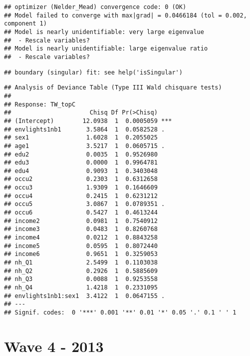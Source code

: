 \documentclass[
]{book}
\begin{document}
\begin{verbatim}
## optimizer (Nelder_Mead) convergence code: 0 (OK)
## Model failed to converge with max|grad| = 0.0466184 (tol = 0.002, component 1)
## Model is nearly unidentifiable: very large eigenvalue
##  - Rescale variables?
## Model is nearly unidentifiable: large eigenvalue ratio
##  - Rescale variables?
\end{verbatim}

\begin{verbatim}
## boundary (singular) fit: see help('isSingular')
\end{verbatim}

\begin{verbatim}
## Analysis of Deviance Table (Type III Wald chisquare tests)
## 
## Response: TW_topC
##                      Chisq Df Pr(>Chisq)    
## (Intercept)        12.0938  1  0.0005059 ***
## envlights1nb1       3.5864  1  0.0582528 .  
## sex1                1.6028  1  0.2055025    
## age1                3.5217  1  0.0605715 .  
## edu2                0.0035  1  0.9526980    
## edu3                0.0000  1  0.9964781    
## edu4                0.9093  1  0.3403048    
## occu2               0.2303  1  0.6312658    
## occu3               1.9309  1  0.1646609    
## occu4               0.2415  1  0.6231212    
## occu5               3.0867  1  0.0789351 .  
## occu6               0.5427  1  0.4613244    
## income2             0.0981  1  0.7540912    
## income3             0.0483  1  0.8260768    
## income4             0.0212  1  0.8843258    
## income5             0.0595  1  0.8072440    
## income6             0.9651  1  0.3259053    
## nh_Q1               2.5499  1  0.1103038    
## nh_Q2               0.2926  1  0.5885609    
## nh_Q3               0.0088  1  0.9253558    
## nh_Q4               1.4218  1  0.2331095    
## envlights1nb1:sex1  3.4122  1  0.0647155 .  
## ---
## Signif. codes:  0 '***' 0.001 '**' 0.01 '*' 0.05 '.' 0.1 ' ' 1
\end{verbatim}

\hypertarget{wave-4---2013}{%
\section{Wave 4 - 2013}\label{wave-4---2013}}
\end{document}
